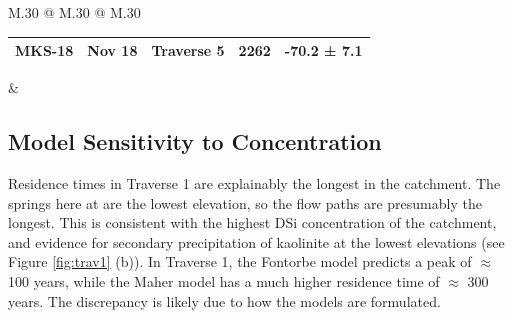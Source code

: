 \begin{landscape}
\begin{table}
\begin{tabular}{M{.30\textwidth} @{\hspace{4cm}} M{.30\textwidth} @{\hspace{4cm}} M{.30\textwidth}}
\begin{tabular}{l l l l l}
    MKS-18 & Nov 18 & Traverse 5 & 2262 & -70.2 ±  7.1 \\
    \hline
    \end{tabular}
    &
    \\ %
    \end{tabular}
\end{table}
\end{landscape}

   \newpage


\subsection{Model Sensitivity to Concentration}

Residence times in Traverse 1 are explainably the longest in the catchment. The springs here at are the lowest elevation, so the flow paths are presumably the longest. This is consistent with the highest DSi concentration of the catchment, and evidence for secondary precipitation of kaolinite at the lowest elevations (see Figure \ref{fig:trav1} (b)). In Traverse 1, the Fontorbe model predicts a peak of $\approx$ 100 years, while the Maher model has a much higher residence time of $\approx$ 300 years. The discrepancy is likely due to how the models are formulated.

